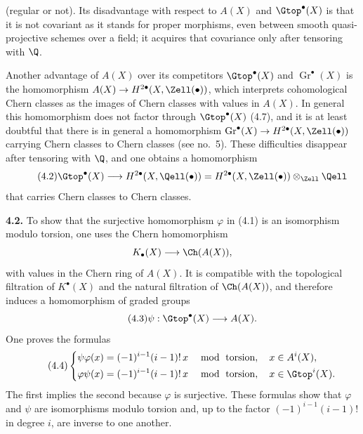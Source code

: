 (regular or not). Its disadvantage with respect to $A(X)$ and
$\Gtop^\bullet(X)$ is that it is not covariant as it stands for proper
morphisms, even between smooth quasi-projective schemes over a field; it
acquires that covariance only after tensoring with $\Q$.

Another advantage of $A(X)$ over its competitors $\Gtop^\bullet(X)$ and
$\operatorname{Gr}^\bullet(X)$ is the homomorphism
$A(X)\to H^{2\bullet}(X,\Zell(\bullet))$, which interprets cohomological
Chern classes as the images of Chern classes with values in $A(X)$. In
general this homomorphism does not factor through $\Gtop^\bullet(X)$ (4.7),
and it is at least doubtful that there is in general a homomorphism
$\operatorname{Gr}^\bullet(X)\to H^{2\bullet}(X,\Zell(\bullet))$ carrying
Chern classes to Chern classes (see no.~5). These difficulties disappear
after tensoring with $\Q$, and one obtains a homomorphism
\begin{equation}\tag{4.2}
 \Gtop^\bullet(X)\longrightarrow H^{2\bullet}(X,\Qell(\bullet))
  =H^{2\bullet}(X,\Zell(\bullet))\otimes_{\Zell}\Qell
\end{equation}
that carries Chern classes to Chern classes.

\textbf{4.2.} To show that the surjective homomorphism $\varphi$ in (4.1)
is an isomorphism modulo torsion, one uses the Chern homomorphism
\[
 K_\bullet(X)\longrightarrow \Ch(A(X)),
\]
with values in the Chern ring of $A(X)$. It is compatible with the
topological filtration of $K^\bullet(X)$ and the natural filtration of
$\Ch(A(X))$, and therefore induces a homomorphism of graded groups
\begin{equation}\tag{4.3}
 \psi:\Gtop^\bullet(X)\longrightarrow A(X).
\end{equation}
One proves the formulas
\begin{equation}\tag{4.4}
\left\{
\begin{aligned}
 \psi\varphi(x)&=(-1)^{i-1}(i-1)!\,x
   &&\bmod\text{ torsion},\quad x\in A^i(X),\\
 \varphi\psi(x)&=(-1)^{i-1}(i-1)!\,x
   &&\bmod\text{ torsion},\quad x\in \Gtop^i(X).
\end{aligned}
\right.
\end{equation}
The first implies the second because $\varphi$ is surjective. These formulas
show that $\varphi$ and $\psi$ are isomorphisms modulo torsion and, up to
the factor $(-1)^{i-1}(i-1)!$ in degree $i$, are inverse to one another.

